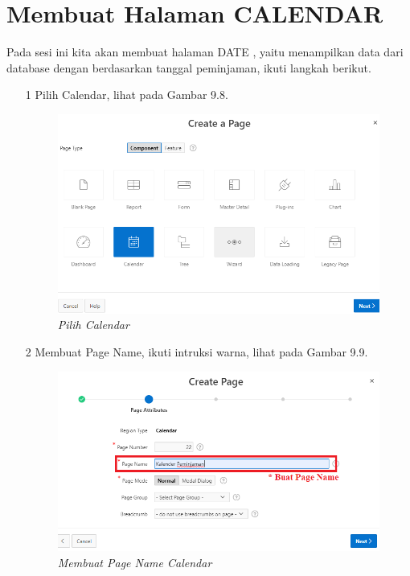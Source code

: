\section{Membuat Halaman CALENDAR}
Pada sesi ini kita akan membuat halaman DATE , yaitu menampilkan data dari database dengan berdasarkan tanggal peminjaman, ikuti langkah berikut.
\begin{itemize}
    \item[1]Pilih Calendar, lihat pada Gambar 9.8.
    \begin{figure}
        \centering
        \includegraphics[scale=0.4]{figures/date/date1.png}
        \caption{\textit{Pilih Calendar}}
        \label{Pilih Calendar}
    \end{figure}
    \item[2]Membuat Page Name, ikuti intruksi warna, lihat pada Gambar 9.9.
    \begin{figure}
        \centering
        \includegraphics[scale=0.4]{figures/date/date2.png}
        \caption{\textit{Membuat Page Name Calendar}}
        \label{Membuat Page Name Calendar}

\end{figure}
\end{itemize}

